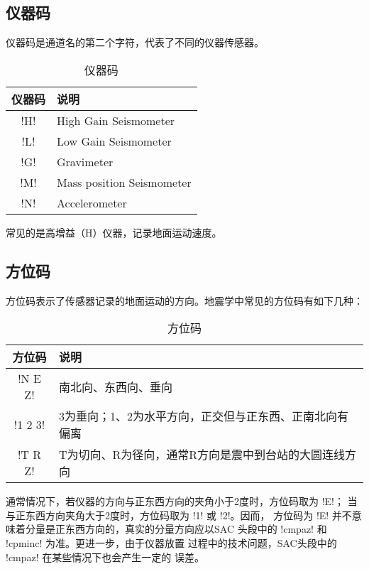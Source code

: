 \subsection{仪器码}
仪器码是通道名的第二个字符，代表了不同的仪器传感器。
\begin{table}[H]
\centering
\caption{仪器码}
\begin{tabular}{cl}
\toprule
仪器码      &   说明   \\
\midrule
!H!  &   High Gain Seismometer      \\
!L!  &   Low Gain Seismometer       \\
!G!  &   Gravimeter                 \\
!M!  &   Mass position Seismometer  \\
!N!  &   Accelerometer              \\
\bottomrule
\end{tabular}
\end{table}
常见的是高增益（H）仪器，记录地面运动速度。

\subsection{方位码}
方位码表示了传感器记录的地面运动的方向。地震学中常见的方位码有如下几种：
\begin{table}[H]
\centering
\caption{方位码}
\begin{tabular}{cl}
\toprule
方位码           &   说明   \\
\midrule
!N E Z!   &   南北向、东西向、垂向   \\
!1 2 3!   &   3为垂向；1、2为水平方向，正交但与正东西、正南北向有偏离 \\
!T R Z!   &   T为切向、R为径向，通常R方向是震中到台站的大圆连线方向    \\
\bottomrule
\end{tabular}
\end{table}

通常情况下，若仪器的方向与正东西方向的夹角小于2度时，方位码取为 !E!；
当与正东西方向夹角大于2度时，方位码取为 !1! 或 !2!。因而，
方位码为 !E! 并不意味着分量是正东西方向的，真实的分量方向应以SAC
头段中的 !cmpaz! 和 !cpminc! 为准。更进一步，由于仪器放置
过程中的技术问题，SAC头段中的 !cmpaz! 在某些情况下也会产生一定的
误差。
